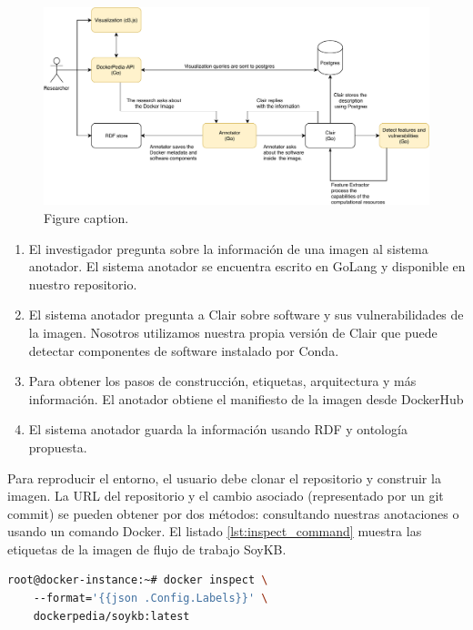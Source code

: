 \begin{figure}[]
\includegraphics[width=\textwidth]{Figures/arch.pdf}
\caption{Figure caption.}\label{fig:arch}
\end{figure}


\begin{enumerate}
    \item El investigador pregunta sobre la información de una imagen al sistema anotador. El sistema anotador se encuentra escrito en GoLang y disponible en nuestro repositorio.
    \item El sistema anotador pregunta a Clair sobre software y sus vulnerabilidades de la imagen. Nosotros utilizamos nuestra propia versión de Clair que puede detectar componentes de software instalado por Conda.
    \item Para obtener los pasos de construcción, etiquetas, arquitectura y más información. El anotador obtiene el manifiesto de la imagen desde DockerHub
    \item El sistema anotador guarda la información usando RDF y ontología propuesta.
\end{enumerate}


Para reproducir el entorno, el usuario debe clonar el repositorio y construir la imagen. La URL del repositorio y el cambio asociado (representado por un git commit) se pueden obtener por dos métodos: consultando nuestras anotaciones o usando un comando Docker. El listado \ref{lst:inspect_command} muestra las etiquetas de la imagen de flujo de trabajo SoyKB.


\begin{lstlisting}[caption={Inspect image annotations},label={lst:inspect_command},language=bash]
root@docker-instance:~# docker inspect \ 
    --format='{{json .Config.Labels}}' \ 
    dockerpedia/soykb:latest
\end{lstlisting}

